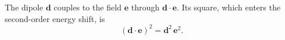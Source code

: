 \documentclass{article}
\begin{document}
The dipole $\mathbf{d}$ couples to the field $\mathbf{e}$ through $\mathbf{d}\cdot\mathbf{e}$.
Its square, which enters the second-order energy shift, is
\begin{equation}
\left(\mathbf{d}\cdot\mathbf{e}\right)^2 = \mathbf{d}^2\,\mathbf{e}^2 .
\label{eq:dd}
\end{equation}
\end{document}
